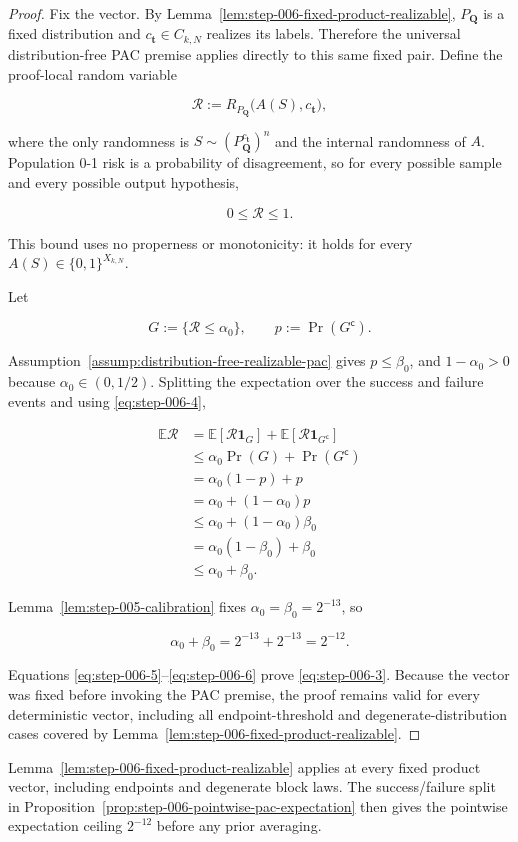 \begin{proof}
Fix the vector. By
Lemma~\ref{lem:step-006-fixed-product-realizable},
\(P_{\boldsymbol Q}\) is a fixed distribution and
\(c_{\boldsymbol t}\in C_{k,N}\) realizes its labels. Therefore the
universal distribution-free PAC premise applies directly to this same
fixed pair. Define the proof-local random variable

\[
\mathcal R
:=R_{P_{\boldsymbol Q}}\bigl(A(S),c_{\boldsymbol t}\bigr),
\]

where the only randomness is
\(S\sim(P_{\boldsymbol Q}^{c_{\boldsymbol t}})^n\) and the internal
randomness of \(A\). Population 0-1 risk is a probability of disagreement,
so for every possible sample and every possible output hypothesis,

\[
0\le\mathcal R\le1.
\tag{S6.4}\label{eq:step-006-4}
\]

This bound uses no properness or monotonicity: it holds for every
\(A(S)\in\{0,1\}^{X_{k,N}}\).

Let

\[
G:=\{\mathcal R\le\alpha_0\},
\qquad p:=\Pr(G^{\mathsf c}).
\]

Assumption~\ref{assump:distribution-free-realizable-pac} gives
\(p\le\beta_0\), and \(1-\alpha_0>0\) because
\(\alpha_0\in(0,1/2)\). Splitting the expectation over the success and
failure events and using \eqref{eq:step-006-4},

\[
\begin{aligned}
\mathbb E\mathcal R
&=\mathbb E[\mathcal R\mathbf 1_G]
  +\mathbb E[\mathcal R\mathbf 1_{G^{\mathsf c}}]\\
&\le \alpha_0\Pr(G)+\Pr(G^{\mathsf c})\\
&=\alpha_0(1-p)+p\\
&=\alpha_0+(1-\alpha_0)p\\
&\le\alpha_0+(1-\alpha_0)\beta_0\\
&=\alpha_0(1-\beta_0)+\beta_0\\
&\le\alpha_0+\beta_0.
\end{aligned}
\tag{S6.5}\label{eq:step-006-5}
\]

Lemma~\ref{lem:step-005-calibration} fixes
\(\alpha_0=\beta_0=2^{-13}\), so

\[
\alpha_0+\beta_0=2^{-13}+2^{-13}=2^{-12}.
\tag{S6.6}\label{eq:step-006-6}
\]

Equations \eqref{eq:step-006-5}--\eqref{eq:step-006-6} prove \eqref{eq:step-006-3}. Because the vector was fixed before invoking
the PAC premise, the proof remains valid for every deterministic vector,
including all endpoint-threshold and degenerate-distribution cases covered
by Lemma~\ref{lem:step-006-fixed-product-realizable}. \end{proof}
Lemma~\ref{lem:step-006-fixed-product-realizable} applies at every fixed
product vector, including endpoints and degenerate block laws.  The
success/failure split in
Proposition~\ref{prop:step-006-pointwise-pac-expectation} then gives the
pointwise expectation ceiling $2^{-12}$ before any prior averaging.

